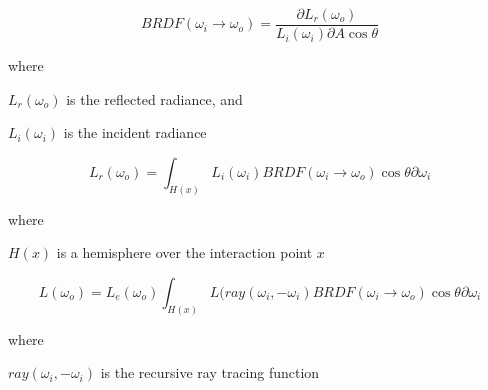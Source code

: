 \begin{equation}
BRDF(\omega_{i} \rightarrow \omega_{o}) = \frac{\partial L_{r}(\omega_{o})}{L_{i}(\omega_{i})\partial A\cos\theta}
\end{equation}

\noindent where
\begin{description}
	\setlength\itemsep{0.05em}
	\item  $L_r(\omega_{o})$ is the reflected radiance, and
	\item  $L_i(\omega_{i})$ is the incident radiance
\end{description}

\begin{equation}
L_{r}(\omega_{o}) = \int_{H(x)} L_{i}(\omega_{i})  BRDF(\omega_{i} \rightarrow \omega_{o}) \cos\theta\partial\omega_{i}
\end{equation}

\noindent where
\begin{description}
	\setlength\itemsep{0.05em}
	\item  $H(x)$ is a hemisphere over the interaction point $x$
\end{description}

\begin{equation}
L(\omega_{o}) = L_{e}(\omega_{o}) \int_{H(x)} L(ray(\omega_{i}, -\omega_{i})BRDF(\omega_{i} \rightarrow \omega_{o})\cos\theta\partial\omega_{i}
\end{equation}

\noindent where
\begin{description}
	\setlength\itemsep{0.05em}
	\item  $ray(\omega_{i}, -\omega_{i})$ is the recursive ray tracing function
\end{description}


